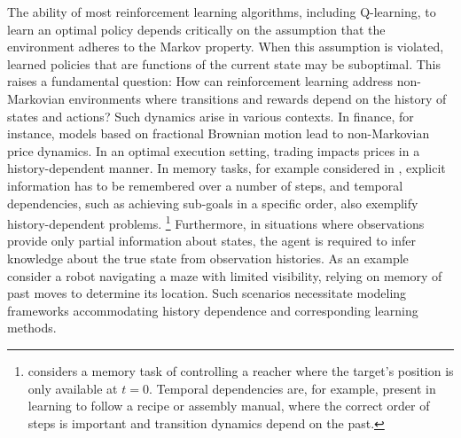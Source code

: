 \documentclass[
    a4paper,
    11pt,
    bibliography=totoc,
    listof=totoc,      
    headinclude=true,
    cleardoublepage=empty,
]{scrbook}
\theoremstyle{plain}
\theoremstyle{definition}
\theoremstyle{remark}
\begin{document}
The ability of most reinforcement learning algorithms, including Q-learning, to 
learn an optimal policy depends critically on the assumption that the 
environment adheres to the Markov property. When this assumption is violated, 
learned policies that are functions of the current state may be suboptimal. 
This raises a fundamental question: How can reinforcement learning address 
non-Markovian environments where transitions and rewards depend on the history 
of states and actions? Such dynamics arise in various contexts. In finance, for 
instance, models based on fractional Brownian motion lead to non-Markovian 
price dynamics. In an optimal execution setting, trading 
impacts prices in a history-dependent manner. In memory tasks, for example considered in \cite{heess2015_mcwrnn}, explicit information has to be remembered over a number of steps, and temporal dependencies, such as achieving 
sub-goals in a specific order, also exemplify history-dependent problems.%
\footnote{
    \cite{heess2015_mcwrnn} considers a memory task of controlling a reacher 
    where the target's position is only available at $t=0$. Temporal 
    dependencies are, for example, present in learning to follow a recipe or 
    assembly manual, where the correct order of steps is important and 
    transition dynamics depend on the past.
} Furthermore, %
in situations where observations provide only 
partial information about states, the agent is required to infer knowledge 
about the true state from observation histories. As an example consider a robot 
navigating a maze with limited visibility, relying on memory of past moves to 
determine its location. Such scenarios necessitate modeling frameworks 
accommodating history dependence and corresponding learning methods.
\end{document}
